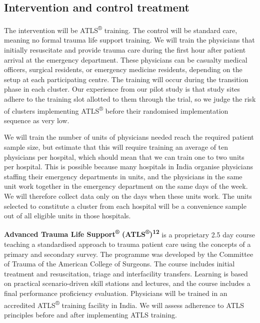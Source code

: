 \documentclass[
]{scrartcl}
\begin{document}
\subsection{Intervention and control
treatment}\label{intervention-and-control-treatment}

The intervention will be ATLS\textsuperscript{®} training. The control
will be standard care, meaning no formal trauma life support training.
We will train the physicians that initially resuscitate and provide
trauma care during the first hour after patient arrival at the emergency
department. These physicians can be casualty medical officers, surgical
residents, or emergency medicine residents, depending on the setup at
each participating centre. The training will occur during the transition
phase in each cluster. Our experience from our pilot study is that study
sites adhere to the training slot allotted to them through the trial, so
we judge the risk of clusters implementing ATLS\textsuperscript{®}
before their randomised implementation sequence as very low.

We will train the number of units of physicians needed reach the
required patient sample size, but estimate that this will require
training an average of ten physicians per hospital, which should mean
that we can train one to two units per hospital. This is possible
because many hospitals in India organise physicians staffing their
emergency departments in units, and the physicians in the same unit work
together in the emergency department on the same days of the week. We
will therefore collect data only on the days when these units work. The
units selected to constitute a cluster from each hospital will be a
convenience sample out of all eligible units in those hospitals.

\textbf{Advanced Trauma Life Support\textsuperscript{®}
(ATLS\textsuperscript{®})\textsuperscript{12}} is a proprietary 2.5 day
course teaching a standardised approach to trauma patient care using the
concepts of a primary and secondary survey. The programme was developed
by the Committee of Trauma of the American College of Surgeons. The
course includes initial treatment and resuscitation, triage and
interfacility transfers. Learning is based on practical scenario-driven
skill stations and lectures, and the course includes a final performance
proficiency evaluation. Physicians will be trained in an accredited
ATLS\textsuperscript{®} training facility in India. We will assess
adherence to ATLS principles before and after implementing ATLS
training.
\end{document}
